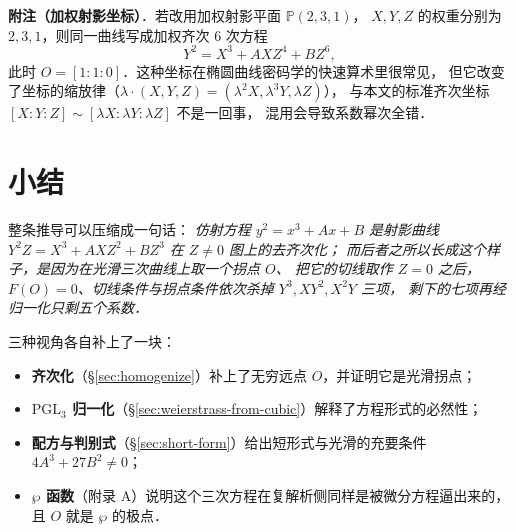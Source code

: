 \documentclass[10pt,a4paper]{article}
\numberwithin{equation}{section}
\begin{document}
\noindent\textbf{附注（加权射影坐标）}．若改用加权射影平面 $\mathbb P(2,3,1)$，
$X,Y,Z$ 的权重分别为 $2,3,1$，则同一曲线写成加权齐次 $6$ 次方程
\[
Y^{2}=X^{3}+AXZ^{4}+BZ^{6},
\]
此时 $O=[1:1:0]$．这种坐标在椭圆曲线密码学的快速算术里很常见，
但它改变了坐标的缩放律（$\lambda\cdot(X,Y,Z)=(\lambda^{2}X,\lambda^{3}Y,\lambda Z)$），
与本文的标准齐次坐标 $[X:Y:Z]\sim[\lambda X:\lambda Y:\lambda Z]$ 不是一回事，
混用会导致系数幂次全错．

\section{小结}

整条推导可以压缩成一句话：
\emph{仿射方程 $y^{2}=x^{3}+Ax+B$ 是射影曲线 $Y^{2}Z=X^{3}+AXZ^{2}+BZ^{3}$ 在 $Z\neq0$ 图上的去齐次化；
而后者之所以长成这个样子，是因为在光滑三次曲线上取一个拐点 $O$、
把它的切线取作 $Z=0$ 之后，$F(O)=0$、切线条件与拐点条件依次杀掉 $Y^{3},XY^{2},X^{2}Y$ 三项，
剩下的七项再经归一化只剩五个系数．}

三种视角各自补上了一块：
\begin{itemize}
\item \textbf{齐次化}（\S\ref{sec:homogenize}）补上了无穷远点 $O$，并证明它是光滑拐点；
\item \textbf{$\mathrm{PGL}_{3}$ 归一化}（\S\ref{sec:weierstrass-from-cubic}）解释了方程形式的必然性；
\item \textbf{配方与判别式}（\S\ref{sec:short-form}）给出短形式与光滑的充要条件 $4A^{3}+27B^{2}\neq0$；
\item \textbf{$\wp$ 函数}（附录 A）说明这个三次方程在复解析侧同样是被微分方程逼出来的，且 $O$ 就是 $\wp$ 的极点．
\end{itemize}

\printbibliography
\end{document}
